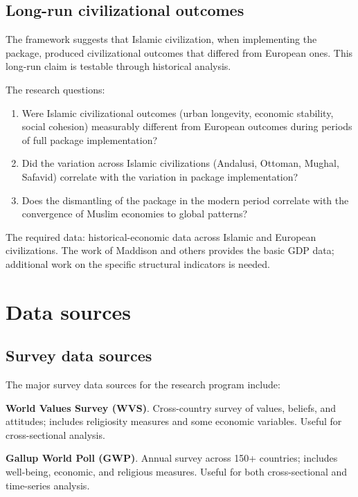 \subsection{Long-run civilizational outcomes}

The framework suggests that Islamic civilization, when
implementing the package, produced civilizational outcomes that
differed from European ones. This long-run claim is testable
through historical analysis.

The research questions:

\begin{enumerate}[leftmargin=2em]
    \item Were Islamic civilizational outcomes (urban longevity,
    economic stability, social cohesion) measurably different
    from European outcomes during periods of full package
    implementation?
    \item Did the variation across Islamic civilizations
    (Andalusi, Ottoman, Mughal, Safavid) correlate with the
    variation in package implementation?
    \item Does the dismantling of the package in the modern
    period correlate with the convergence of Muslim economies to
    global patterns?
\end{enumerate}

The required data: historical-economic data across Islamic and
European civilizations. The work of Maddison and others provides
the basic GDP data; additional work on the specific structural
indicators is needed.

\section{Data sources}
\label{sec:agenda-data}

\subsection{Survey data sources}

The major survey data sources for the research program include:

\textbf{World Values Survey (WVS)}. Cross-country survey of
values, beliefs, and attitudes; includes religiosity measures and
some economic variables. Useful for cross-sectional analysis.

\textbf{Gallup World Poll (GWP)}. Annual survey across 150+
countries; includes well-being, economic, and religious measures.
Useful for both cross-sectional and time-series analysis.

